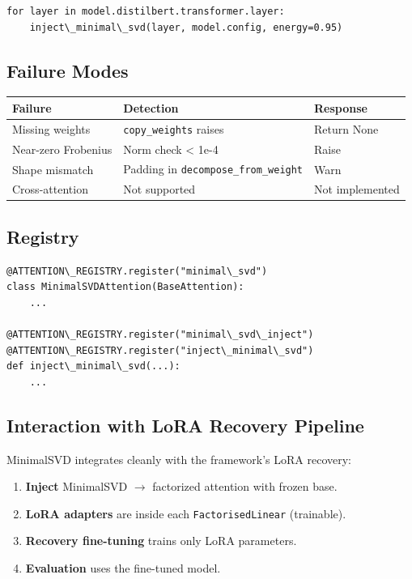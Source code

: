 \begin{lstlisting}
for layer in model.distilbert.transformer.layer:
    inject\_minimal\_svd(layer, model.config, energy=0.95)
\end{lstlisting}

\subsection{Failure Modes}

\begin{table}[H]
\centering
\small
\begin{tabular}{lll}
\toprule
\textbf{Failure} & \textbf{Detection} & \textbf{Response} \\
\midrule
Missing weights & \texttt{copy\_weights} raises & Return None \\
Near-zero Frobenius & Norm check \textless{} 1e-4 & Raise \\
Shape mismatch & Padding in \texttt{decompose\_from\_weight} & Warn \\
Cross-attention & Not supported & Not implemented \\
\bottomrule
\end{tabular}
\end{table}

\subsection{Registry}

\begin{lstlisting}
@ATTENTION\_REGISTRY.register("minimal\_svd")
class MinimalSVDAttention(BaseAttention):
    ...

@ATTENTION\_REGISTRY.register("minimal\_svd\_inject")
@ATTENTION\_REGISTRY.register("inject\_minimal\_svd")
def inject\_minimal\_svd(...):
    ...
\end{lstlisting}

\subsection{Interaction with LoRA Recovery Pipeline}

MinimalSVD integrates cleanly with the framework's LoRA recovery:

\begin{enumerate}
\item \textbf{Inject} MinimalSVD $\to$ factorized attention with frozen base.
\item \textbf{LoRA adapters} are inside each \texttt{FactorisedLinear} (trainable).
\item \textbf{Recovery fine-tuning} trains only LoRA parameters.
\item \textbf{Evaluation} uses the fine-tuned model.

\end{enumerate}
